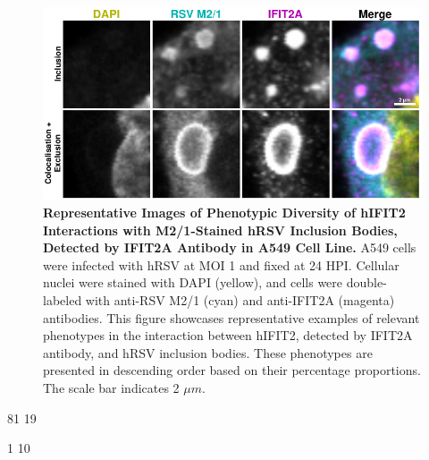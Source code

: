 \begin{figure}
    \centering
    \includegraphics[width=1\linewidth]{08. Chapter 3/Figs/02. Infection/02. IFIT2/01. IFIT2A/09. i2a a549 hrsv m21.pdf} 
    \caption[Representative Images of Phenotypic Diversity of hIFIT2 Interactions with M2/1-Stained hRSV Inclusion Bodies, Detected by IFIT2A Antibody in A549 Cell Line.]{\textbf{Representative Images of Phenotypic Diversity of hIFIT2 Interactions with M2/1-Stained hRSV Inclusion Bodies, Detected by IFIT2A Antibody in A549 Cell Line.} A549 cells were infected with hRSV at MOI 1 and fixed at 24 HPI. Cellular nuclei were stained with DAPI (yellow), and cells were double-labeled with anti-RSV M2/1 (cyan) and anti-IFIT2A (magenta) antibodies. This figure showcases representative examples of relevant phenotypes in the interaction between hIFIT2, detected by IFIT2A antibody, and hRSV inclusion bodies. These phenotypes are presented in descending order based on their percentage proportions. The scale bar indicates 2 \(\mu m\).}
    \label{fig:Representative Images of Phenotypic Diversity of hIFIT2 Interactions with M2/1-Stained hRSV Inclusion Bodies, Detected by IFIT2A Antibody in A549 Cell Line}
\end{figure}

81 19

1 10

